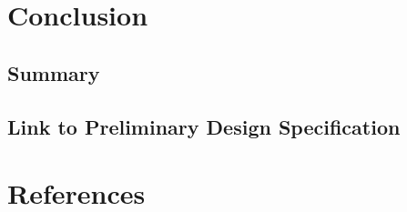 \documentclass[]{report}
\begin{document}
\chapter{Conclusion}

\section{Summary}

\section{Link to Preliminary Design Specification}

\chapter*{References}
\end{document}
